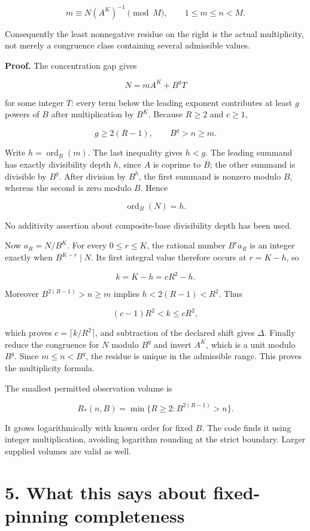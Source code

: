 \documentclass[
  11pt,
  a4paper,
]{report}
\begin{document}
\[
\boxed{
m\equiv N(A^K)^{-1}\pmod M,
\qquad 1\le m\le n<M.
}
\]

Consequently the least nonnegative residue on the right is the actual
multiplicity, not merely a congruence class containing several
admissible values.

\textbf{Proof.} The concentration gap gives

\[
N=mA^K+B^gT
\]

for some integer \(T\): every term below the leading exponent
contributes at least \(g\) powers of \(B\) after multiplication by
\(B^K\). Because \(R\ge2\) and \(c\ge1\),

\[
g\ge2(R-1),
\qquad
B^g>n\ge m.
\]

Write \(h=\operatorname{ord}_B(m)\). The last inequality gives \(h<g\).
The leading summand has exactly divisibility depth \(h\), since \(A\) is
coprime to \(B\); the other summand is divisible by \(B^g\). After
division by \(B^h\), the first summand is nonzero modulo \(B\), whereas
the second is zero modulo \(B\). Hence

\[
\operatorname{ord}_B(N)=h.
\]

No additivity assertion about composite-base divisibility depth has been
used.

Now \(a_R=N/B^K\). For every \(0\le r\le K\), the rational number
\(B^r a_R\) is an integer exactly when \(B^{K-r}\mid N\). Its first
integral value therefore occurs at \(r=K-h\), so

\[
k=K-h=cR^2-h.
\]

Moreover \(B^{2(R-1)}>n\ge m\) implies \(h<2(R-1)<R^2\). Thus

\[
(c-1)R^2<k\le cR^2,
\]

which proves \(c=\lceil k/R^2\rceil\), and subtraction of the declared
shift gives \(\Delta\). Finally reduce the congruence for \(N\) modulo
\(B^g\) and invert \(A^K\), which is a unit modulo \(B^g\). Since
\(m\le n<B^g\), the residue is unique in the admissible range. This
proves the multiplicity formula.

The smallest permitted observation volume is

\[
R_*(n,B)=\min\{R\ge2:B^{2(R-1)}>n\}.
\]

It grows logarithmically with known order for fixed \(B\). The code
finds it using integer multiplication, avoiding logarithm rounding at
the strict boundary. Larger supplied volumes are valid as well.

\hypertarget{what-this-says-about-fixed-pinning-completeness}{%
\section{5. What this says about fixed-pinning
completeness}\label{what-this-says-about-fixed-pinning-completeness}}
\end{document}
